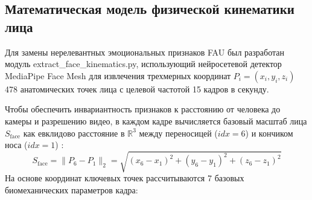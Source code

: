 \documentclass[a4paper,14pt]{extarticle}
\begin{document}
	\subsection{Математическая модель физической кинематики лица}
	Для замены нерелевантных эмоциональных признаков FAU \cite{ivankin} был разработан модуль extract\_\allowbreak face\_\allowbreak kinematics.py, использующий нейросетевой детектор MediaPipe Face Mesh \cite{mediapipe} для извлечения трехмерных координат $P_i = (x_i, y_i, z_i)$ 478 анатомических точек лица с целевой частотой 15 кадров в секунду.
	
	Чтобы обеспечить инвариантность признаков к расстоянию от человека до камеры и разрешению видео, в каждом кадре вычисляется базовый масштаб лица $S_{\text{face}}$ как евклидово расстояние в $\mathbb{R}^3$ между переносицей ($idx = 6$) и кончиком носа ($idx = 1$) \cite{mediapipe}:
	\begin{equation}
		S_{\text{face}} = \| P_{6} - P_{1} \|_2 = \sqrt{(x_6 - x_1)^2 + (y_6 - y_1)^2 + (z_6 - z_1)^2}
	\end{equation}
	На основе координат ключевых точек рассчитываются 7 базовых биомеханических параметров кадра:
\end{document}

